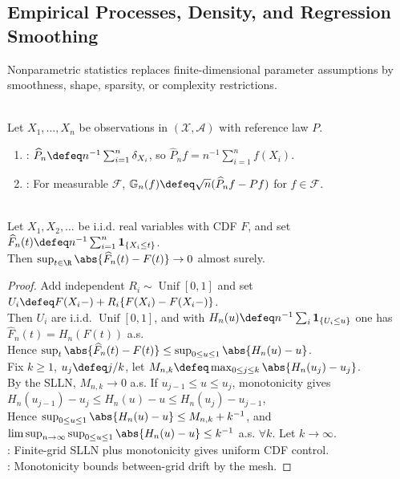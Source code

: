 \subsection{Empirical Processes, Density, and Regression Smoothing}

Nonparametric statistics replaces finite-dimensional parameter assumptions by smoothness, shape, sparsity, or complexity restrictions.

\begin{definition} \label{def:empirical-measure-and-process} \\
Let $X_1,\ldots,X_n$ be observations in $(\mathcal{X},\mathcal{A})$ with reference law $P$.
\begin{enumerate}[label=(\roman*)]
\setlength{\itemsep}{0pt}
\item {}: $\widehat{P}_n\defeq n^{-1}\sum_{i=1}^n\delta_{X_i}$, so $\widehat{P}_nf=n^{-1}\sum_{i=1}^nf(X_i)$.
\item {}: For measurable $\mathcal{F}$, $\mathbb{G}_n(f)\defeq\sqrt{n}(\widehat{P}_nf-Pf)$ for $f\in\mathcal{F}$.
\end{enumerate}
\end{definition}

\begin{theorem} \label{thm:glivenko-cantelli} \\
Let $X_1,X_2,\ldots$ be i.i.d. real variables with CDF $F$, and set $\widehat{F}_n(t)\defeq n^{-1}\sum_{i=1}^n\mathbf{1}_{\{X_i\leq t\}}$.\\
Then $\sup_{t\in\R}\abs{\widehat{F}_n(t)-F(t)}\to0$ almost surely.
\begin{proof} Add independent $R_i\sim\operatorname{Unif}[0,1]$ and set $U_i\defeq F(X_i-)+R_i\{F(X_i)-F(X_i-)\}$.\\
Then $U_i$ are i.i.d. $\operatorname{Unif}[0,1]$, and with $H_n(u)\defeq n^{-1}\sum_i\mathbf{1}_{\{U_i\leq u\}}$ one has $\widehat{F}_n(t)=H_n(F(t))$ a.s.\\
Hence $\sup_t\abs{\widehat{F}_n(t)-F(t)}\leq\sup_{0\leq u\leq1}\abs{H_n(u)-u}$.\\
Fix $k\geq1$, $u_j\defeq j/k$, let $M_{n,k}\defeq\max_{0\leq j\leq k}\abs{H_n(u_j)-u_j}$.\\
By the SLLN, $M_{n,k}\to0$ a.s. If $u_{j-1}\leq u\leq u_j$, monotonicity gives $H_n(u_{j-1})-u_j\leq H_n(u)-u\leq H_n(u_j)-u_{j-1}$,\\
Hence $\sup_{0\leq u\leq1}\abs{H_n(u)-u}\leq M_{n,k}+k^{-1}$, and $\limsup_{n\to\infty}\sup_{0\leq u\leq1}\abs{H_n(u)-u}\leq k^{-1}$ a.s. $\forall k$. Let $k\to\infty$.\\
: Finite-grid SLLN plus monotonicity gives uniform CDF control.\\
: Monotonicity bounds between-grid drift by the mesh.
\end{proof}
\end{theorem}

